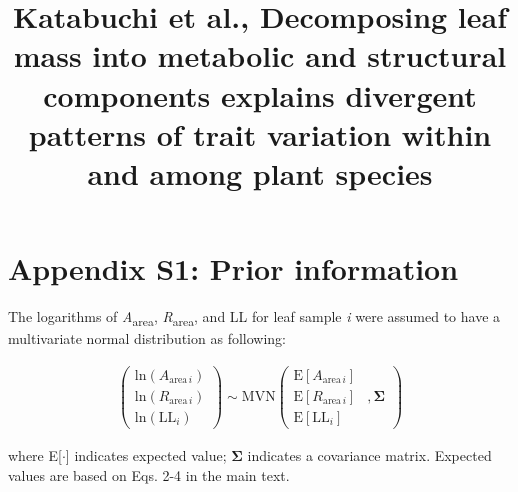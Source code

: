 \documentclass[
  12pt,
  letterpaper,
  DIV=11,
  numbers=noendperiod]{scrartcl}
\title{Katabuchi et al., Decomposing leaf mass into metabolic and
structural components explains divergent patterns of trait variation
within and among plant species}
\author{}
\date{}
\renewcommand*\contentsname{Table of contents}
\newcommand\contentsname{Table of contents}
\begin{document}
\maketitle
\ifdefined\Shaded\renewenvironment{Shaded}{\begin{tcolorbox}[breakable, boxrule=0pt, frame hidden, enhanced, interior hidden, borderline west={3pt}{0pt}{shadecolor}, sharp corners]}{\end{tcolorbox}}\fi

\renewcommand*\contentsname{Table of contents}
{
\hypersetup{linkcolor=}
\setcounter{tocdepth}{3}
\tableofcontents
}
\newpage

\hypertarget{appendix-s1-prior-information}{%
\section{Appendix S1: Prior
information}\label{appendix-s1-prior-information}}

The logarithms of \emph{A}\textsubscript{area},
\emph{R}\textsubscript{area}, and LL for leaf sample \emph{i} were
assumed to have a multivariate normal distribution as following:

\begin{align}
\left(
\begin{array}{ccc}
\mathrm{ln}(A_{\mathrm{area} \, i})\\
\mathrm{ln}(R_{\mathrm{area} \, i}) \\
\mathrm{ln}(\mathrm{LL}_i)
\end{array}
\right)
\sim \mathrm{MVN}
\left(
\begin{array}{rrr}
\mathrm{E}[A_{\mathrm{area} \, i}]\\
\mathrm{E}[R_{\mathrm{area} \, i}] &, \boldsymbol{\Sigma}\\
\mathrm{E}[\mathrm{LL}_i]
\end{array}
\right) \tag{S1}
\end{align}

where E{[}\(\cdot\){]} indicates expected value; \(\boldsymbol{\Sigma}\)
indicates a covariance matrix. Expected values are based on Eqs. 2-4 in
the main text.
\end{document}
